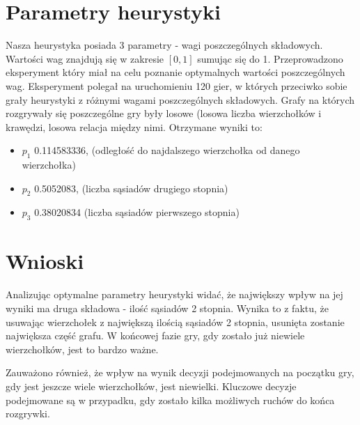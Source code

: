 \documentclass[11pt,a4paper]{article}
\begin{document}
\section{Parametry heurystyki}
Nasza heurystyka posiada 3 parametry - wagi poszczególnych składowych. Wartości wag znajdują się w zakresie $[0,1]$ sumując się do 1. Przeprowadzono eksperyment który miał na celu poznanie optymalnych wartości poszczególnych wag. Eksperyment polegał na uruchomieniu 120 gier, w których przeciwko sobie grały heurystyki z różnymi wagami poszczególnych składowych. Grafy na których rozgrywały się poszczególne gry były losowe (losowa liczba wierzchołków i krawędzi, losowa relacja między nimi. Otrzymane wyniki to:
\begin{itemize}
\item $p_1$ 0.114583336, (odległość do najdalszego wierzchołka od danego wierzchołka)
\item $p_2$ 0.5052083, (liczba sąsiadów drugiego stopnia)
\item $p_3$ 0.38020834 (liczba sąsiadów pierwszego stopnia)
\end{itemize}

\section{Wnioski}
Analizując optymalne parametry heurystyki widać, że największy wpływ na jej wyniki ma druga składowa - ilość sąsiadów 2 stopnia. Wynika to z faktu, że usuwając wierzchołek z największą ilością sąsiadów 2 stopnia, usunięta zostanie największa część grafu. W końcowej fazie gry, gdy zostało już niewiele wierzchołków, jest to bardzo ważne.

Zauważono również, że wpływ na wynik decyzji podejmowanych na początku gry, gdy jest jeszcze wiele wierzchołków, jest niewielki. Kluczowe decyzje podejmowane są w przypadku, gdy zostało kilka możliwych ruchów do końca rozgrywki. 
\end{document}
